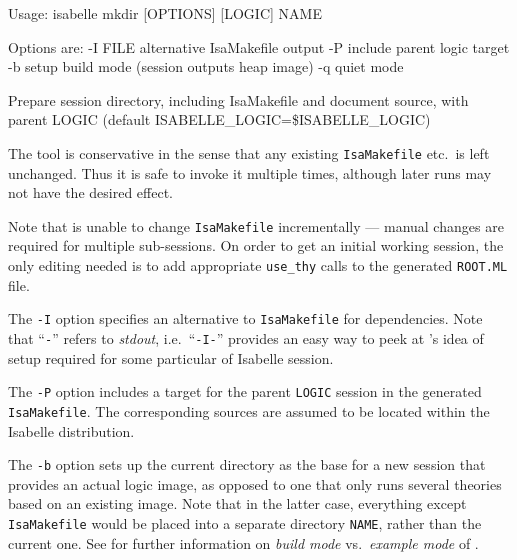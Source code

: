 \begin{isabellebody}
\begin{isamarkuptext}
\begin{ttbox}
Usage: isabelle mkdir [OPTIONS] [LOGIC] NAME

  Options are:
    -I FILE      alternative IsaMakefile output
    -P           include parent logic target
    -b           setup build mode (session outputs heap image)
    -q           quiet mode

  Prepare session directory, including IsaMakefile and document source,
  with parent LOGIC (default ISABELLE_LOGIC=\$ISABELLE_LOGIC)
\end{ttbox}

  The \hyperlink{tool.mkdir}{\mbox{}} tool is conservative in the sense that any
  existing \verb|IsaMakefile| etc.\ is left unchanged.  Thus it
  is safe to invoke it multiple times, although later runs may not
  have the desired effect.

  Note that \hyperlink{tool.mkdir}{\mbox{}} is unable to change \verb|IsaMakefile|
  incrementally --- manual changes are required for multiple
  sub-sessions.  On order to get an initial working session, the only
  editing needed is to add appropriate \verb|use_thy| calls to the
  generated \verb|ROOT.ML| file.%
\end{isamarkuptext}%
\isamarkuptrue%
%
\isamarkuptrue%
%
\begin{isamarkuptext}%
The \verb|-I| option specifies an alternative to \verb|IsaMakefile| for dependencies.  Note that ``\verb|-|'' refers
  to \emph{stdout}, i.e.\ ``\verb|-I-|'' provides an easy way
  to peek at \hyperlink{tool.mkdir}{\mbox{}}'s idea of \hyperlink{tool.make}{\mbox{}} setup required for
  some particular of Isabelle session.

  \medskip The \verb|-P| option includes a target for the
  parent \verb|LOGIC| session in the generated \verb|IsaMakefile|.  The corresponding sources are assumed to be located
  within the Isabelle distribution.

  \medskip The \verb|-b| option sets up the current directory
  as the base for a new session that provides an actual logic image,
  as opposed to one that only runs several theories based on an
  existing image.  Note that in the latter case, everything except
  \verb|IsaMakefile| would be placed into a separate directory
  \verb|NAME|, rather than the current one.  See
   for further information on \emph{build
  mode} vs.\ \emph{example mode} of \hyperlink{tool.usedir}{\mbox{}}.


\end{isamarkuptext}
\end{isabellebody}
